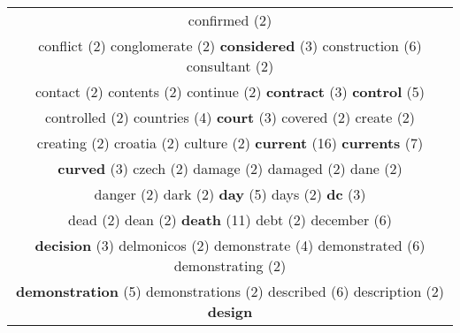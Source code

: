 \documentclass[12pt,a4paper]{article}
\begin{document}
\begin{center}
\begin{longtable}{|c|}
{\footnotesize \textcolor{Verde} {confirmed}} \footnotesize{(2)}  \\ {\footnotesize \textcolor{Verde} {conflict}} \footnotesize{(2)} {\footnotesize \textcolor{Verde} {conglomerate}} \footnotesize{(2)} {\small \textcolor{Laranja} {\bf considered}} \footnotesize{(3)} {\Large \textcolor{VermEscuro} {construction}} \footnotesize{(6)} {\footnotesize \textcolor{Verde} {consultant}} \footnotesize{(2)}  \\ {\footnotesize \textcolor{Verde} {contact}} \footnotesize{(2)} {\footnotesize \textcolor{Verde} {contents}} \footnotesize{(2)} {\footnotesize \textcolor{Verde} {continue}} \footnotesize{(2)} {\small \textcolor{Laranja} {\bf contract}} \footnotesize{(3)} {\large \textcolor{Roxo} {\bf control}} \footnotesize{(5)}  \\ {\footnotesize \textcolor{Verde} {controlled}} \footnotesize{(2)} {\normalsize \textcolor{VerdeLocao} {countries}} \footnotesize{(4)} {\small \textcolor{Laranja} {\bf court}} \footnotesize{(3)} {\footnotesize \textcolor{Verde} {covered}} \footnotesize{(2)} {\footnotesize \textcolor{Verde} {create}} \footnotesize{(2)}  \\ {\footnotesize \textcolor{Verde} {creating}} \footnotesize{(2)} {\footnotesize \textcolor{Verde} {croatia}} \footnotesize{(2)} {\footnotesize \textcolor{Verde} {culture}} \footnotesize{(2)} {\Huge \textcolor{AzulEscuro} {\bf current}} \footnotesize{(16)} {\LARGE \textcolor{Rosa} {\bf currents}} \footnotesize{(7)}  \\ {\small \textcolor{Laranja} {\bf curved}} \footnotesize{(3)} {\footnotesize \textcolor{Verde} {czech}} \footnotesize{(2)} {\footnotesize \textcolor{Verde} {damage}} \footnotesize{(2)} {\footnotesize \textcolor{Verde} {damaged}} \footnotesize{(2)} {\footnotesize \textcolor{Verde} {dane}} \footnotesize{(2)}  \\ {\footnotesize \textcolor{Verde} {danger}} \footnotesize{(2)} {\footnotesize \textcolor{Verde} {dark}} \footnotesize{(2)} {\large \textcolor{Roxo} {\bf day}} \footnotesize{(5)} {\footnotesize \textcolor{Verde} {days}} \footnotesize{(2)} {\small \textcolor{Laranja} {\bf dc}} \footnotesize{(3)}  \\ {\footnotesize \textcolor{Verde} {dead}} \footnotesize{(2)} {\footnotesize \textcolor{Verde} {dean}} \footnotesize{(2)} {\Huge \textcolor{AzulEscuro} {\bf death}} \footnotesize{(11)} {\footnotesize \textcolor{Verde} {debt}} \footnotesize{(2)} {\Large \textcolor{VermEscuro} {december}} \footnotesize{(6)}  \\ {\small \textcolor{Laranja} {\bf decision}} \footnotesize{(3)} {\footnotesize \textcolor{Verde} {delmonicos}} \footnotesize{(2)} {\normalsize \textcolor{VerdeLocao} {demonstrate}} \footnotesize{(4)} {\Large \textcolor{VermEscuro} {demonstrated}} \footnotesize{(6)} {\footnotesize \textcolor{Verde} {demonstrating}} \footnotesize{(2)}  \\ {\large \textcolor{Roxo} {\bf demonstration}} \footnotesize{(5)} {\footnotesize \textcolor{Verde} {demonstrations}} \footnotesize{(2)} {\Large \textcolor{VermEscuro} {described}} \footnotesize{(6)} {\footnotesize \textcolor{Verde} {description}} \footnotesize{(2)} {\large \textcolor{Roxo} {\bf design}} 
\end{longtable}
\end{center}
\end{document}
